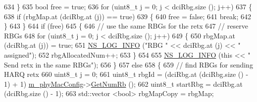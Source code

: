 \begin{DoxyCode}
{634                                 \}
635                                 \textcolor{keywordtype}{bool} free = \textcolor{keyword}{true};
636                                 \textcolor{keywordflow}{for} (uint8\_t j = 0; j < dciRbg.size (); j++)
637                                 \{
638                                         \textcolor{keywordflow}{if} (rbgMap.at (dciRbg.at (j)) == \textcolor{keyword}{true})
639                                         \{
640                                                 free = \textcolor{keyword}{false};
641                                                 \textcolor{keywordflow}{break};
642                                         \}
643                                 \}
644                                 \textcolor{keywordflow}{if} (free)
645                                 \{
646                                         \textcolor{comment}{// use the same RBGs for the retx}
647                                         \textcolor{comment}{// reserve RBGs}
648                                         \textcolor{keywordflow}{for} (uint8\_t j = 0; j < dciRbg.size (); j++)
649                                         \{
650                                                 rbgMap.at (dciRbg.at (j)) = \textcolor{keyword}{true};
651                                                 \hyperlink{group__logging_gafbd73ee2cf9f26b319f49086d8e860fb}{NS\_LOG\_INFO} (\textcolor{stringliteral}{"RBG "} << dciRbg.at (j) << \textcolor{stringliteral}{"
       assigned"});
652                                                 rbgAllocatedNum++;
653                                         \}
654 
655                                         \hyperlink{group__logging_gafbd73ee2cf9f26b319f49086d8e860fb}{NS\_LOG\_INFO} (\textcolor{keyword}{this} << \textcolor{stringliteral}{" Send retx in the same RBGs"});
656                                 \}
657                                 \textcolor{keywordflow}{else}
658                                 \{
659                                         \textcolor{comment}{// find RBGs for sending HARQ retx}
660                                         uint8\_t j = 0;
661                                         uint8\_t rbgId = (dciRbg.at (dciRbg.size () - 1) + 1) %
      \hyperlink{classns3_1_1MmWaveMacScheduler_a24d7af4971d2e500fe543cefbafa2fd9}{m\_phyMacConfig}->\hyperlink{classns3_1_1MmWavePhyMacCommon_a4c5f323fd722d6eec52efda5d76f97ad}{GetNumRb} ();
662                                         uint8\_t startRbg = dciRbg.at (dciRbg.size () - 1);
663                                         std::vector <bool> rbgMapCopy = rbgMap;
}
\end{DoxyCode}
